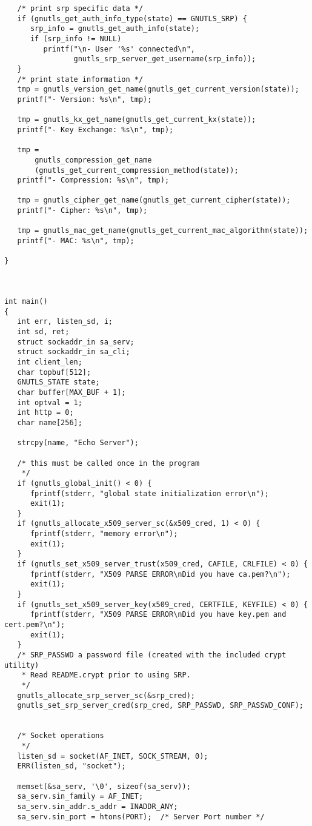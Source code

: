 \begin{verbatim}
   /* print srp specific data */
   if (gnutls_get_auth_info_type(state) == GNUTLS_SRP) {
      srp_info = gnutls_get_auth_info(state);
      if (srp_info != NULL)
         printf("\n- User '%s' connected\n",
                gnutls_srp_server_get_username(srp_info));
   }
   /* print state information */
   tmp = gnutls_version_get_name(gnutls_get_current_version(state));
   printf("- Version: %s\n", tmp);

   tmp = gnutls_kx_get_name(gnutls_get_current_kx(state));
   printf("- Key Exchange: %s\n", tmp);

   tmp =
       gnutls_compression_get_name
       (gnutls_get_current_compression_method(state));
   printf("- Compression: %s\n", tmp);

   tmp = gnutls_cipher_get_name(gnutls_get_current_cipher(state));
   printf("- Cipher: %s\n", tmp);

   tmp = gnutls_mac_get_name(gnutls_get_current_mac_algorithm(state));
   printf("- MAC: %s\n", tmp);

}



int main()
{
   int err, listen_sd, i;
   int sd, ret;
   struct sockaddr_in sa_serv;
   struct sockaddr_in sa_cli;
   int client_len;
   char topbuf[512];
   GNUTLS_STATE state;
   char buffer[MAX_BUF + 1];
   int optval = 1;
   int http = 0;
   char name[256];

   strcpy(name, "Echo Server");

   /* this must be called once in the program
    */
   if (gnutls_global_init() < 0) {
      fprintf(stderr, "global state initialization error\n");
      exit(1);
   }
   if (gnutls_allocate_x509_server_sc(&x509_cred, 1) < 0) {
      fprintf(stderr, "memory error\n");
      exit(1);
   }
   if (gnutls_set_x509_server_trust(x509_cred, CAFILE, CRLFILE) < 0) {
      fprintf(stderr, "X509 PARSE ERROR\nDid you have ca.pem?\n");
      exit(1);
   }
   if (gnutls_set_x509_server_key(x509_cred, CERTFILE, KEYFILE) < 0) {
      fprintf(stderr, "X509 PARSE ERROR\nDid you have key.pem and cert.pem?\n");
      exit(1);
   }
   /* SRP_PASSWD a password file (created with the included crypt utility) 
    * Read README.crypt prior to using SRP.
    */
   gnutls_allocate_srp_server_sc(&srp_cred);
   gnutls_set_srp_server_cred(srp_cred, SRP_PASSWD, SRP_PASSWD_CONF);


   /* Socket operations
    */
   listen_sd = socket(AF_INET, SOCK_STREAM, 0);
   ERR(listen_sd, "socket");

   memset(&sa_serv, '\0', sizeof(sa_serv));
   sa_serv.sin_family = AF_INET;
   sa_serv.sin_addr.s_addr = INADDR_ANY;
   sa_serv.sin_port = htons(PORT);  /* Server Port number */


\end{verbatim}
